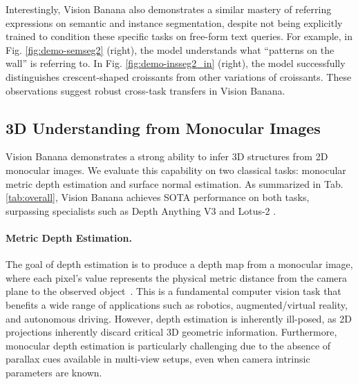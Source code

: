 \documentclass[11pt, a4paper, copyright, gdm]{google}
\begin{document}
Interestingly, Vision Banana also demonstrates a similar mastery of referring expressions on semantic and instance segmentation, despite not being explicitly trained to condition these specific tasks on free-form text queries.
For example, in Fig. \ref{fig:demo-semseg2} (right), the model understands what ``patterns on the wall'' is referring to.
In Fig. \ref{fig:demo-insseg2_in} (right), the model successfully distinguishes crescent-shaped croissants from other variations of croissants.
These observations suggest robust cross-task transfers in Vision Banana.




\subsection{3D Understanding from Monocular Images}
Vision Banana demonstrates a strong ability to infer 3D structures from 2D monocular images. We evaluate this capability on two classical tasks: monocular metric depth estimation and surface normal estimation.
As summarized in Tab. \ref{tab:overall}, Vision Banana achieves SOTA performance on both tasks, surpassing specialists such as Depth Anything V3 \citep{dav3} and Lotus-2 \citep{lotus2}.

\paragraph{Metric Depth Estimation.}
The goal of depth estimation is to produce a depth map from a monocular image, where each pixel's value represents the physical metric distance from the camera plane to the observed object~\citep{eigen2014depth}. This is a fundamental computer vision task that benefits a wide range of applications such as robotics, augmented/virtual reality, and autonomous driving. 
However, depth estimation is inherently ill-posed, as 2D projections inherently discard critical 3D geometric information.
Furthermore, monocular depth estimation is particularly challenging due to the absence of parallax cues available in multi-view setups, even when camera intrinsic parameters are known.
\end{document}
